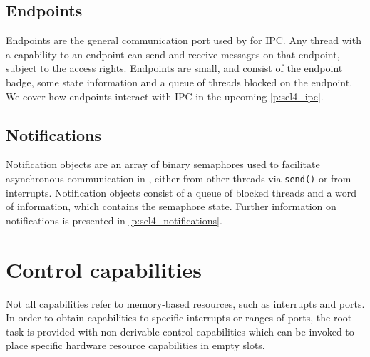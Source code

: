 \subsection{Endpoints}
\label{s:endpoints}

Endpoints are the general communication port used by \selfour for \gls{IPC}.
Any thread with a
capability to an endpoint can send and receive messages on that endpoint, subject to the access
rights. Endpoints are small, and consist of the endpoint badge, some state information and a queue
of threads blocked on the endpoint. We cover how endpoints interact with IPC in the upcoming
\cref{p:sel4_ipc}. 

\subsection{Notifications}

Notification objects are an array of binary semaphores used to facilitate asynchronous communication in \selfour, either from other threads via \texttt{send()} or from
interrupts. Notification objects consist of a queue of blocked threads and a word of information,
which contains the semaphore state. Further information on notifications is presented in
\cref{p:sel4_notifications}. 

\section{Control capabilities}
\label{s:control-capabilities}

Not all capabilities refer to memory-based resources, such as interrupts and \IO ports.
In order to obtain capabilities to specific interrupts or ranges of \IO ports, the root task is
provided with non-derivable control capabilities which can be invoked to place specific hardware
resource capabilities in empty slots.

